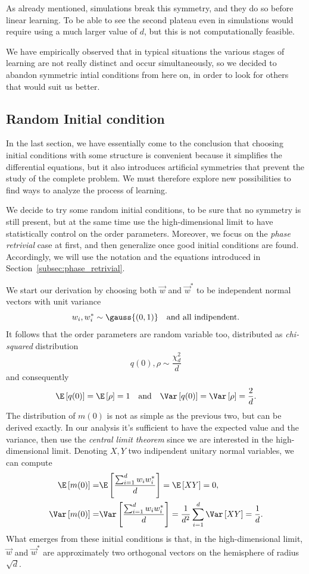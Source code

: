 As already mentioned, simulations break this symmetry, and they do so before linear learning.
To be able to see the second plateau even in simulations would require using a much larger value of \(d\),
but this is not computationally feasible. 

We have empirically observed that in typical situations the various stages of learning are not really distinct and occur simultaneously,
so we decided to abandon symmetric intial conditions from here on,
in order to look for others that would suit us better.


\subsection{Random Initial condition}
In the last section, we have essentially come to the conclusion that
choosing initial conditions with some structure is convenient
because it simplifies the differential equations,
but it also introduces artificial symmetries that prevent the study of the complete problem.
We must therefore explore new possibilities to find ways to analyze the process of learning.

We decide to try some random initial conditions, to be sure that no symmetry is still present,
but at the same time use the high-dimensional limit to have statistically control on the 
order parameters. Moreover, we focus on the \emph{phase retrivial} case at first, 
and then generalize once good initial conditions are found.
Accordingly, we will use the notation and the equations introduced in Section~\ref{subsec:phase_retrivial}.

We start our derivation by choosing both \(\vec{w}\) and \(\vec{w}^*\) to be independent normal
vectors with unit variance
\[
  w_{i}, w^*_{i} \sim \gauss{(0,1)}\quad\text{and all indipendent.}
\]
It follows that the order parameters are random variable too, distributed as
\emph{chi-squared} distribution
\[
  q(0),\rho \sim \frac{\chi^2_d}{d}
\]
and consequently 
\[
  \E\left[q(0)\right] = \E\left[\rho\right] = 1 \quad\text{and}\quad
  \Var\left[q(0)\right] = \Var\left[\rho\right] = \frac{2}{d}.
\]
The distribution of \(m{(0)}\) is not as simple as the previous two, but can be derived exactly.
In our analysis it's sufficient to have the expected value and the variance, then use the 
\emph{central limit theorem} since we are interested in the high-dimensional limit.
Denoting \(X,Y\) two indipendent unitary normal variables, we can compute
\[\begin{split}
  \E\left[m{(0)}\right] =& \E\left[\frac{\sum_{i=1}^d w_iw^*_i}{d}\right] = \E\left[XY\right] = 0, \\
  \Var\left[m{(0)}\right] =& \Var\left[\frac{\sum_{i=1}^d w_iw^*_i}{d}\right]
    = \frac{1}{d^2}\sum_{i=1}^d \Var\left[XY\right] = \frac{1}{d}.
\end{split}\]
What emerges from these initial conditions is that, in the high-dimensional limit,
\(\vec{w}\) and \(\vec{w}^*\) are approximately two orthogonal vectors on the hemisphere of radius \(\sqrt{d}\).

